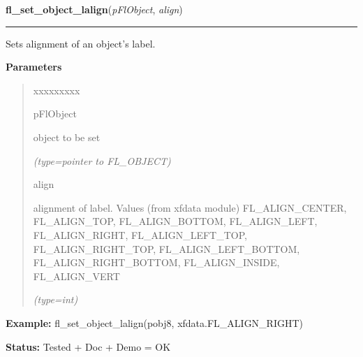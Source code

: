 \hspace{.8\funcindent}\begin{boxedminipage}{\funcwidth}

    \raggedright \textbf{fl\_set\_object\_lalign}(\textit{pFlObject}, \textit{align})

    \vspace{-1.5ex}

    \rule{\textwidth}{0.5\fboxrule}
\setlength{\parskip}{2ex}
    Sets alignment of an object's label.

\setlength{\parskip}{1ex}
      \textbf{Parameters}
      \vspace{-1ex}

      \begin{quote}
        \begin{Ventry}{xxxxxxxxx}

          \item[pFlObject]

          object to be set

            {\it (type=pointer to FL\_OBJECT)}

          \item[align]

          alignment of label. Values (from xfdata module) 
          FL\_ALIGN\_CENTER, FL\_ALIGN\_TOP, FL\_ALIGN\_BOTTOM, 
          FL\_ALIGN\_LEFT, FL\_ALIGN\_RIGHT, FL\_ALIGN\_LEFT\_TOP, 
          FL\_ALIGN\_RIGHT\_TOP, FL\_ALIGN\_LEFT\_BOTTOM, 
          FL\_ALIGN\_RIGHT\_BOTTOM, FL\_ALIGN\_INSIDE, FL\_ALIGN\_VERT

            {\it (type=int)}

        \end{Ventry}

      \end{quote}

\textbf{Example:} fl\_set\_object\_lalign(pobj8, xfdata.FL\_ALIGN\_RIGHT)



\textbf{Status:} Tested + Doc + Demo = OK



    \end{boxedminipage}

    \label{xformslib:flbasic:fl_get_object_lalign}

    \vspace{0.5ex}

